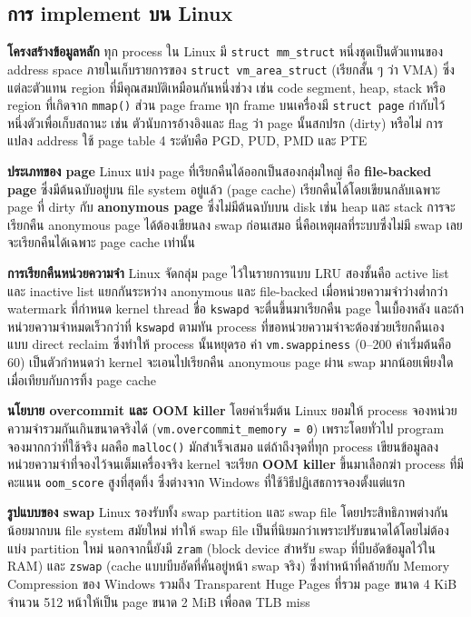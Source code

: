 \documentclass[a4paper,11pt]{article}
\newcommand{\code}[1]{\texttt{#1}}
\begin{document}
\subsection{การ implement บน Linux}

\textbf{โครงสร้างข้อมูลหลัก} ทุก process ใน Linux มี \code{struct mm\_struct} หนึ่งชุดเป็นตัวแทนของ address space ภายในเก็บรายการของ \code{struct vm\_area\_struct} (เรียกสั้น ๆ ว่า VMA) ซึ่งแต่ละตัวแทน region ที่มีคุณสมบัติเหมือนกันหนึ่งช่วง เช่น code segment, heap, stack หรือ region ที่เกิดจาก \code{mmap()} ส่วน page frame ทุก frame บนเครื่องมี \code{struct page} กำกับไว้หนึ่งตัวเพื่อเก็บสถานะ เช่น ตัวนับการอ้างอิงและ flag ว่า page นั้นสกปรก (dirty) หรือไม่ การแปลง address ใช้ page table 4 ระดับคือ PGD, PUD, PMD และ PTE

\textbf{ประเภทของ page} Linux แบ่ง page ที่เรียกคืนได้ออกเป็นสองกลุ่มใหญ่ คือ \textbf{file-backed page} ซึ่งมีต้นฉบับอยู่บน file system อยู่แล้ว (page cache) เรียกคืนได้โดยเขียนกลับเฉพาะ page ที่ dirty กับ \textbf{anonymous page} ซึ่งไม่มีต้นฉบับบน disk เช่น heap และ stack การจะเรียกคืน anonymous page ได้ต้องเขียนลง swap ก่อนเสมอ นี่คือเหตุผลที่ระบบซึ่งไม่มี swap เลยจะเรียกคืนได้เฉพาะ page cache เท่านั้น

\textbf{การเรียกคืนหน่วยความจำ} Linux จัดกลุ่ม page ไว้ในรายการแบบ LRU สองชั้นคือ active list และ inactive list แยกกันระหว่าง anonymous และ file-backed เมื่อหน่วยความจำว่างต่ำกว่า watermark ที่กำหนด kernel thread ชื่อ \code{kswapd} จะตื่นขึ้นมาเรียกคืน page ในเบื้องหลัง และถ้าหน่วยความจำหมดเร็วกว่าที่ \code{kswapd} ตามทัน process ที่ขอหน่วยความจำจะต้องช่วยเรียกคืนเองแบบ direct reclaim ซึ่งทำให้ process นั้นหยุดรอ ค่า \code{vm.swappiness} (0--200 ค่าเริ่มต้นคือ 60) เป็นตัวกำหนดว่า kernel จะเอนไปเรียกคืน anonymous page ผ่าน swap มากน้อยเพียงใดเมื่อเทียบกับการทิ้ง page cache

\textbf{นโยบาย overcommit และ OOM killer} โดยค่าเริ่มต้น Linux ยอมให้ process จองหน่วยความจำรวมกันเกินขนาดจริงได้ (\code{vm.overcommit\_memory = 0}) เพราะโดยทั่วไป program จองมากกว่าที่ใช้จริง ผลคือ \code{malloc()} มักสำเร็จเสมอ แต่ถ้าถึงจุดที่ทุก process เขียนข้อมูลลงหน่วยความจำที่จองไว้จนเต็มเครื่องจริง kernel จะเรียก \textbf{OOM killer} ขึ้นมาเลือกฆ่า process ที่มีคะแนน \code{oom\_score} สูงที่สุดทิ้ง ซึ่งต่างจาก Windows ที่ใช้วิธีปฏิเสธการจองตั้งแต่แรก

\textbf{รูปแบบของ swap} Linux รองรับทั้ง swap partition และ swap file โดยประสิทธิภาพต่างกันน้อยมากบน file system สมัยใหม่ ทำให้ swap file เป็นที่นิยมกว่าเพราะปรับขนาดได้โดยไม่ต้องแบ่ง partition ใหม่ นอกจากนี้ยังมี \code{zram} (block device สำหรับ swap ที่บีบอัดข้อมูลไว้ใน RAM) และ \code{zswap} (cache แบบบีบอัดที่คั่นอยู่หน้า swap จริง) ซึ่งทำหน้าที่คล้ายกับ Memory Compression ของ Windows รวมถึง Transparent Huge Pages ที่รวม page ขนาด 4 KiB จำนวน 512 หน้าให้เป็น page ขนาด 2 MiB เพื่อลด TLB miss
\end{document}
